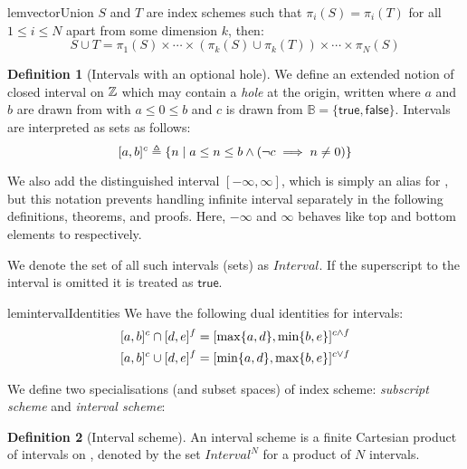 \documentclass[acmlarge,review,anonymous]{acmart}\settopmatter{printfolios=true}
\theoremstyle{definition}
\newtheorem{defn}{Definition}
\theoremstyle{plain}
\theoremstyle{remark}
\begin{document}
\begin{restatable}{lem}{vectorUnion}
\label{lem:vector-union}
$S$ and $T$ are index schemes such that $\pi_i(S) = \pi_i(T)$ for all $1 \leq i
\leq N$ apart from some dimension $k$, then:
%
  \begin{equation*}
    S \cup  T
    =
    \pi_1(S) \times \cdots \times
    (\pi_k(S) \cup \pi_k(T)) \times \cdots \times
    \pi_N(S)
  \end{equation*}
\end{restatable}
%
\begin{defn}[Intervals with an optional hole]
  We define an extended notion of closed interval on $\textnormal{$\mathbb{Z}$}{}$ which may contain a
  \emph{hole} at the origin, written  where $a$ and $b$ are
  drawn from \bz{} with $a \leq 0 \leq b$ and $c$ is drawn from $\mathbb{B} = \{
  \mathsf{true}, \mathsf{false} \}$. Intervals are interpreted as sets as
  follows:
%
  \begin{equation*}
    \textnormal{$\lbrack a,b\rbrack^{c}$} \triangleq
      \{ n \mid a \leq n \leq b \wedge (\neg c \implies n \neq 0) \}
  \end{equation*}

  We also add the distinguished interval $[-\infty, \infty]$, which is simply an
  alias for \bz{}, but this notation prevents handling infinite interval
  separately in the following definitions, theorems, and proofs. Here, $-\infty$
  and $\infty$ behaves like top and bottom elements to \bz{} respectively.

  We denote the set of all such intervals (sets) as $\textit{Interval}$. If the
  superscript to the interval is omitted it is treated as $\mathsf{true}$.
\end{defn}
%
\begin{restatable}{lem}{intervalIdentities}
 \label{lem:interval-identities}
  We have the following dual identities for \bz{} intervals:
%
  \begin{align*}
    \textnormal{$\lbrack a,b\rbrack^{c}$} \cap \textnormal{$\lbrack d,e\rbrack^{f}$} & =
      \textnormal{$\lbrack\max \{a,d\},\min \{b,e\}\rbrack^{c \wedge f}$} \\
    \textnormal{$\lbrack a,b\rbrack^{c}$} \cup \textnormal{$\lbrack d,e\rbrack^{f}$} & =
      \textnormal{$\lbrack\min \{a,d\},\max \{b,e\}\rbrack^{c \vee f}$}
  \end{align*}
\end{restatable}
%

We define two specialisations (and subset spaces) of index scheme:
\emph{subscript scheme} and \emph{interval scheme}:

\begin{defn}[Interval scheme]
  An interval scheme is a finite Cartesian product of intervals on \bz{},
  denoted by the set $\textit{Interval}^N$ for a product of $N$ intervals.
\end{defn}
\end{document}
